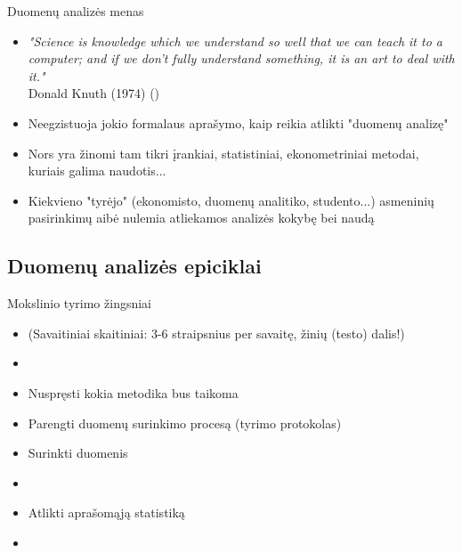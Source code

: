 \documentclass[11pt,xcolor=table]{beamer}
\begin{document}
\begin{frame}{Duomenų analizės menas}
\begin{itemize}
\item \textit{"Science is knowledge which we understand so well that we can teach it to a computer; and if we don't fully understand something, it is an art to deal with it."}
\\Donald Knuth (1974) (\href{http://www.paulgraham.com/knuth.html}{\color{blue}{Knuth: Computer Programming as an Art}})
\item Neegzistuoja jokio formalaus aprašymo, kaip reikia atlikti "duomenų analizę"
\item Nors yra žinomi tam tikri įrankiai, statistiniai, ekonometriniai metodai, kuriais galima naudotis...
\item Kiekvieno "tyrėjo" (ekonomisto, duomenų analitiko, studento...) asmeninių pasirinkimų aibė nulemia atliekamos analizės kokybę bei naudą
\end{itemize}
\end{frame}



\subsection{Duomenų analizės epiciklai}

\begin{frame}{Mokslinio tyrimo žingsniai}
\begin{itemize}
\item {\color{red}{Labai daug skaityti}} (Savaitiniai skaitiniai: 3-6 straipsnius per savaitę, žinių (testo) dalis!)
\item {\color{blue}{Išvystyti klausimą / hipotezę}}
\item Nuspręsti kokia metodika bus taikoma
\item Parengti duomenų surinkimo procesą (tyrimo protokolas)
\item Surinkti duomenis
\item {\color{blue}{Atlikti tiriamąją statistiką}}
\item Atlikti aprašomąją statistiką
\item {\color{blue}{Modeliuoti, atlikti prognozes
\item Interpretuoti rezultatus
\item Aprašyti tyrimo eigą bei rezultatus}}
\end{itemize}
\end{frame}
\end{document}
